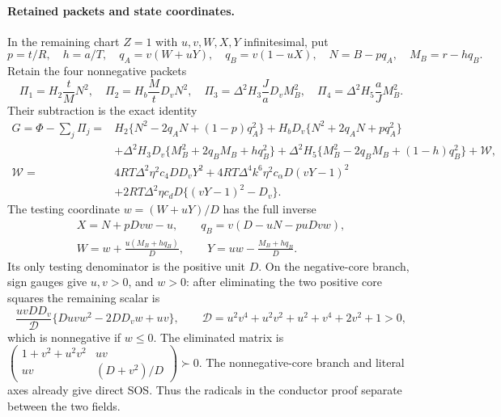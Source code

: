\paragraph{Retained packets and state coordinates.}
In the remaining chart $Z=1$ with $u,v,W,X,Y$ infinitesimal, put
\[
 p=t/R,\quad h=a/T,\quad q_A=v(W+uY),\quad q_B=v(1-uX),
 \quad N=B-pq_A,\quad M_B=r-hq_B.
\]
Retain the four nonnegative packets
\[
 \Pi_1=H_2\frac tM N^2,\quad
 \Pi_2=H_b\frac MtD_vN^2,\quad
 \Pi_3=\Delta^2H_3\frac JaD_vM_B^2,\quad
 \Pi_4=\Delta^2H_5\frac aJM_B^2.                         \tag{SD3}
\]
Their subtraction is the exact identity
\begin{align*}
G=\Phi-\sum_j\Pi_j={}&H_2\{N^2-2q_AN+(1-p)q_A^2\}
 +H_bD_v\{N^2+2q_AN+pq_A^2\}\\
 &+\Delta^2H_3D_v\{M_B^2+2q_BM_B+hq_B^2\}
 +\Delta^2H_5\{M_B^2-2q_BM_B+(1-h)q_B^2\}
 +\mathcal W,\\
\mathcal W={}&4RT\Delta^2\eta^2c_4DD_vY^2
 +4RT\Delta^4k^6\eta^2c_\alpha D(vY-1)^2\\
 &+2RT\Delta^2\eta c_dD\{(vY-1)^2-D_v\}.
                                                               \tag{SD4}
\end{align*}
The testing coordinate $w=(W+uY)/D$ has the full inverse
\[
\begin{gathered}
 X=N+pDvw-u,\qquad q_B=v(D-uN-puDvw),\\
 W=w+\frac{u(M_B+hq_B)}D,\qquad
 Y=uw-\frac{M_B+hq_B}D.
\end{gathered}                                \tag{SD5}
\]
Its only testing denominator is the positive unit $D$.
On the negative-core branch, sign gauges give $u,v>0$, and $w>0$:
after eliminating the two positive core squares the remaining scalar is
\[
 \frac{uvDD_v}{\mathcal D}\{Duv w^2-2DD_vw+uv\},\qquad
 \mathcal D=u^2v^4+u^2v^2+u^2+v^4+2v^2+1>0,
\]
which is nonnegative if $w\le0$. The eliminated matrix is
$\left(\begin{smallmatrix}1+v^2+u^2v^2&uv\\uv&(D+v^2)/D\end{smallmatrix}\right)\succ0$.
The nonnegative-core branch and literal axes already give direct SOS.
Thus the radicals in the conductor proof separate between the two fields.

